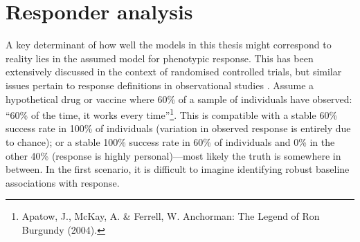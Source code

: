 \section{Responder analysis}

A key determinant of how well the models in this thesis might correspond to reality lies in the assumed model for phenotypic response.
This has been extensively discussed in the context of randomised controlled trials, but similar issues pertain to response definitions in observational studies \autocite{senn2018StatisticalPitfallsPersonalized}.
Assume a hypothetical drug or vaccine where 60\% of a sample of individuals have observed: \enquote{60\% of the time, it works every time}\footnote{Apatow, J., McKay, A. \& Ferrell, W. Anchorman: The Legend of Ron Burgundy (2004).}.
This is compatible with a stable 60\% success rate in 100\% of individuals (variation in observed response is entirely due to chance);
or a stable 100\% success rate in 60\% of individuals and 0\% in the other 40\% (response is highly personal)---most likely the truth is somewhere in between.
In the first scenario, it is difficult to imagine identifying robust baseline associations with response.

